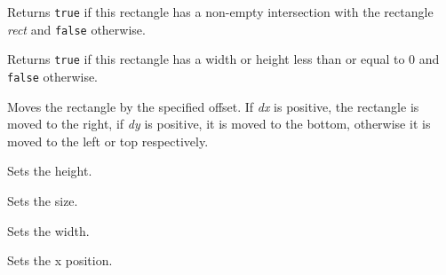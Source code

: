 


\label{wxrectintersects}


Returns {\tt true} if this rectangle has a non-empty intersection with the
rectangle {\it rect} and {\tt false} otherwise.


\label{wxrectisempty}


Returns {\tt true} if this rectangle has a width or height less than or equal to 
0 and {\tt false} otherwise.


\label{wxrectoffset}



Moves the rectangle by the specified offset. If {\it dx} is positive, the
rectangle is moved to the right, if {\it dy} is positive, it is moved to the
bottom, otherwise it is moved to the left or top respectively.


\label{wxrectsetheight}


Sets the height.


\label{wxrectsetsize}


Sets the size.




\label{wxrectsetwidth}


Sets the width.


\label{wxrectsetx}


Sets the x position.


\label{wxrectsety}


